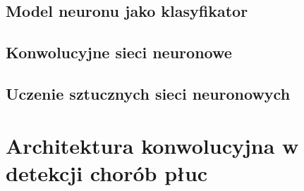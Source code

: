 \documentclass{article}
\begin{document}
\subsection{Model neuronu jako klasyfikator}

\subsection{Konwolucyjne sieci neuronowe}

\subsection{Uczenie sztucznych sieci neuronowych}



\section{Architektura konwolucyjna w detekcji chorób płuc}


\nocite{*}


	
\end{document}

